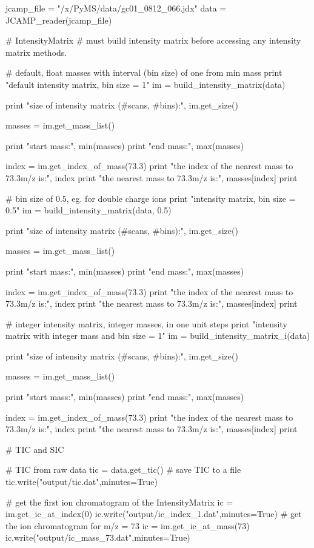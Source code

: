 jcamp_file = "/x/PyMS/data/gc01_0812_066.jdx"
data = JCAMP_reader(jcamp_file)

# IntensityMatrix
# must build intensity matrix before accessing any intensity matrix methods.

# default, float masses with interval (bin size) of one from min mass
print "default intensity matrix, bin size = 1"
im = build_intensity_matrix(data)

print "size of intensity matrix (#scans, #bins):", im.get_size()

masses = im.get_mass_list()

print "start mass:", min(masses)
print "end mass:", max(masses)

index = im.get_index_of_mass(73.3)
print "the index of the nearest mass to 73.3m/z is:", index
print "the nearest mass to 73.3m/z is:", masses[index]
print

# bin size of 0.5, eg. for double charge ions
print "intensity matrix, bin size = 0.5"
im = build_intensity_matrix(data, 0.5)

print "size of intensity matrix (#scans, #bins):", im.get_size()

masses = im.get_mass_list()

print "start mass:", min(masses)
print "end mass:", max(masses)

index = im.get_index_of_mass(73.3)
print "the index of the nearest mass to 73.3m/z is:", index
print "the nearest mass to 73.3m/z is:", masses[index]
print

# integer intensity matrix, integer masses, in one unit steps
print "intensity matrix with integer mass and bin size = 1"
im = build_intensity_matrix_i(data)

print "size of intensity matrix (#scans, #bins):", im.get_size()

masses = im.get_mass_list()

print "start mass:", min(masses)
print "end mass:", max(masses)

index = im.get_index_of_mass(73.3)
print "the index of the nearest mass to 73.3m/z is:", index
print "the nearest mass to 73.3m/z is:", masses[index]
print

# TIC and SIC

# TIC from raw data
tic = data.get_tic()
# save TIC to a file
tic.write("output/tic.dat",minutes=True)

# get the first ion chromatogram of the IntensityMatrix
ic = im.get_ic_at_index(0)
ic.write("output/ic_index_1.dat",minutes=True)
# get the ion chromatogram for m/z = 73
ic = im.get_ic_at_mass(73)
ic.write("output/ic_mass_73.dat",minutes=True)

